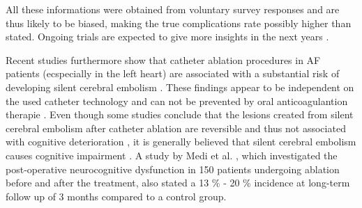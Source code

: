 \documentclass[type=dr, dr=rernat, accentcolor=tud7b,colorbacktitle, bigchapter, openright, twoside, 12pt ]{tudthesis}
\begin{document}

All these informations were obtained from voluntary survey responses and are thus likely to be biased, making the true 
complications rate possibly higher than stated. Ongoing trials are expected to give more insights in the next years \cite{ESC12}.\newline

Recent studies furthermore show that catheter ablation procedures in AF patients (ecspecially in the left heart) are associated with a 
substantial risk of developing silent cerebral embolism \cite{Her13} \cite{Gai10} \cite{Mar13} \cite{Med13} \cite{Schr10} \cite{Lick06}. 
These findings appear to be independent on the used catheter technology \cite{Sor13} and can not be prevented by oral anticoagulantion 
therapie \cite{Mar13}. Even though some studies conclude that the lesions created from silent cerebral embolism after catheter ablation are 
reversible and thus not associated with cognitive deterioration \cite{Sor13} \cite{Her13}, it is generally believed that silent cerebral 
embolism causes cognitive impairment \cite{Kne08}. A study by Medi et al. \cite{Med13}, which investigated the post-operative neurocognitive 
dysfunction in 150 patients undergoing ablation before and after the treatment, also stated a 13 \% - 20 \% incidence at long-term follow up 
of 3 months compared to a control group. \newline
\end{document}
